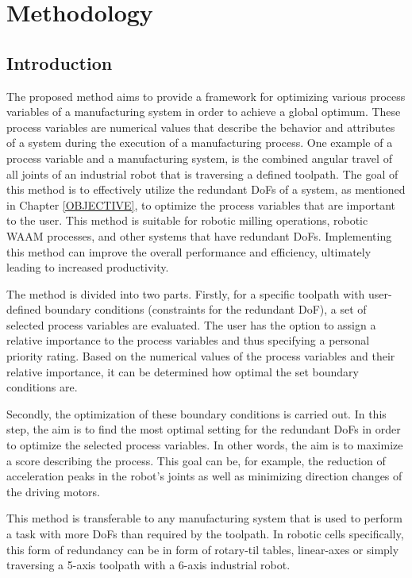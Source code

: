 \chapter{Methodology}\label{METmain}

\section{Introduction}%

The proposed method aims to provide a framework for optimizing various process variables of a manufacturing system in order to achieve a global optimum. These process variables are numerical values that describe the behavior and attributes of a system during the execution of a manufacturing process. One example of a process variable and a manufacturing system, is the combined angular travel of all joints of an industrial robot that is traversing a defined toolpath.
The goal of this method is to effectively utilize the redundant \acrshort{DoF}s of a system, as mentioned in Chapter \ref{OBJECTIVE}, to optimize the process variables that are important to the user. This method is suitable for robotic milling operations, robotic \acrshort{WAAM} processes, and other systems that have redundant \acrshort{DoF}s. Implementing this method can improve the overall performance and efficiency, ultimately leading to increased productivity.

The method is divided into two parts. Firstly, for a specific toolpath with user-defined boundary conditions (constraints for the redundant \acrshort{DoF}), a set of selected process variables are evaluated. 
The user has the option to assign a relative importance to the process variables and thus specifying a personal priority rating. Based on the numerical values of the process variables and their relative importance, it can be determined how optimal the set boundary conditions are.

Secondly, the optimization of these boundary conditions is carried out. In this step, the aim is to find the most optimal setting for the redundant \acrshort{DoF}s in order to optimize the selected process variables. In other words, the aim is to maximize a score describing the process. This goal can be, for example, the reduction of acceleration peaks in the robot's joints as well as minimizing direction changes of the driving motors.

This method is transferable to any manufacturing system that is used to perform a task with more \acrshort{DoF}s than required by the toolpath. In robotic cells specifically, this form of redundancy can be in form of rotary-til tables, linear-axes or simply traversing a 5-axis toolpath with a 6-axis industrial robot. 



